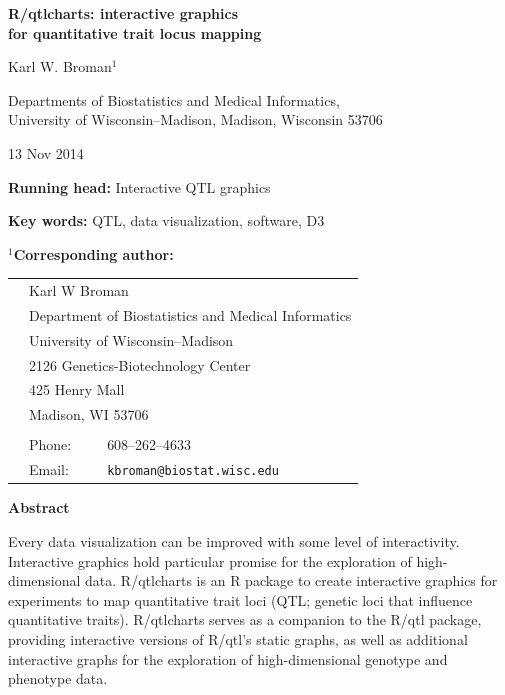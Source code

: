 \documentclass[12pt,letterpaper]{article}
\begin{document}

\vspace*{8mm}
\begin{center}

\textbf{\Large R/qtlcharts: interactive graphics \\
  for quantitative trait locus mapping}

\bigskip \bigskip \bigskip \bigskip

{\large Karl W. Broman$^1$}

\bigskip \bigskip

Departments of Biostatistics and Medical Informatics,
\\ University of Wisconsin--Madison, Madison, Wisconsin 53706
\end{center}


\vfill

\hfill
{\footnotesize 13 Nov 2014}

\newpage

\noindent \textbf{Running head:} Interactive QTL graphics


\bigskip \bigskip \bigskip

\noindent \textbf{Key words:} QTL, data visualization, software, D3


\bigskip \bigskip \bigskip

\noindent \textbf{$^1$Corresponding author:}

\begin{tabular}{lll}
 \\
 \hspace{1cm} & \multicolumn{2}{l}{Karl W Broman} \\
 & \multicolumn{2}{l}{Department of Biostatistics and Medical Informatics} \\
 & \multicolumn{2}{l}{University of Wisconsin--Madison} \\
 & \multicolumn{2}{l}{2126 Genetics-Biotechnology Center} \\
 & \multicolumn{2}{l}{425 Henry Mall} \\
 & \multicolumn{2}{l}{Madison, WI 53706} \\
 \\
 & Phone: & 608--262--4633 \\
 & Email: & \verb|kbroman@biostat.wisc.edu|
\end{tabular}

\newpage

\centerline{\sffamily \textbf{Abstract}}

Every data visualization can be improved with some level of
interactivity. Interactive graphics hold particular promise for the
exploration of high-dimensional data.  R/qtlcharts is an R
package to create interactive graphics for experiments to map
quantitative trait loci (QTL; genetic loci that influence
quantitative traits). R/qtlcharts serves as a companion to the R/qtl
package, providing interactive versions of R/qtl's static graphs, as
well as additional interactive graphs for the exploration of
high-dimensional genotype and phenotype data.
\end{document}

